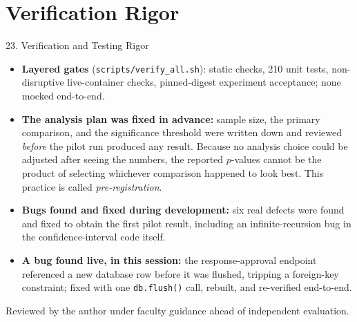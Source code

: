 \documentclass[aspectratio=169, 11pt]{beamer}
\begin{document}
\section{Verification Rigor}
\begin{frame}{23. Verification and Testing Rigor}
    \footnotesize
    \begin{itemize}\setlength\itemsep{4pt}
        \item \textbf{Layered gates} (\texttt{scripts/verify\_all.sh}): static checks, 210 unit tests, non-disruptive live-container checks, pinned-digest experiment acceptance; none mocked end-to-end.
        \item \textbf{The analysis plan was fixed in advance:} sample size, the primary comparison, and the significance threshold were written down and reviewed \emph{before} the pilot run produced any result. Because no analysis choice could be adjusted after seeing the numbers, the reported $p$-values cannot be the product of selecting whichever comparison happened to look best. This practice is called \emph{pre-registration}.
        \item \textbf{Bugs found and fixed during development:} six real defects were found and fixed to obtain the first pilot result, including an infinite-recursion bug in the confidence-interval code itself.
        \item \textbf{A bug found live, in this session:} the response-approval endpoint referenced a new database row before it was flushed, tripping a foreign-key constraint; fixed with one \texttt{db.flush()} call, rebuilt, and re-verified end-to-end.
    \end{itemize}
    \vspace{0.05cm}
    \footnotesize Reviewed by the author under faculty guidance ahead of independent evaluation.
\end{frame}

\end{document}
